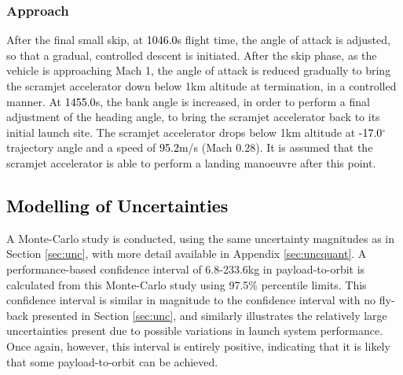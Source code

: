 \subsubsection{Approach}

After the final small skip, at \textcolor{black}{1046.0}s flight time, the angle of attack is adjusted, so that a gradual, controlled descent is initiated. 
After the skip phase, as the vehicle is approaching Mach 1, the angle of attack is reduced gradually to bring the scramjet accelerator down below 1km altitude at termination, in a controlled manner. At \textcolor{black}{1455.0}s, the bank angle is increased, in order to perform a final adjustment of the heading angle, to bring the scramjet accelerator back to its initial launch site. 
The scramjet accelerator drops below 1km altitude at \textcolor{black}{-17.0}$^\circ$ trajectory angle and a speed of \textcolor{black}{95.2}m/s (Mach 0.28). It is assumed that the scramjet accelerator is able to perform a landing manoeuvre after this point. 


\textcolor{black}{
	\section{Modelling of Uncertainties}}\label{sec:uncreturn}
\noindent
A Monte-Carlo study is conducted, using the same uncertainty magnitudes as in Section \ref{sec:unc}, with more detail available in Appendix \ref{sec:uncquant}. A performance-based confidence interval of 6.8-233.6kg in payload-to-orbit is calculated from this Monte-Carlo study using 97.5\% percentile limits. This confidence interval is similar in magnitude to the confidence interval with no fly-back presented in Section \ref{sec:unc}, and similarly illustrates the relatively large uncertainties present due to possible variations in launch system performance. Once again, however, this interval is entirely positive, indicating that it is likely that some payload-to-orbit can be achieved. 

